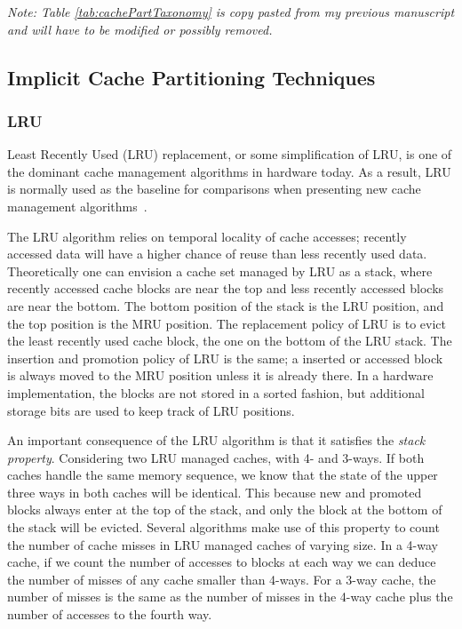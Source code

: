 \textit{Note: Table \ref{tab:cachePartTaxonomy} is copy pasted from my previous manuscript and will have to be modified or possibly removed.}



\subsection{Implicit Cache Partitioning Techniques}

\subsubsection{LRU}

Least Recently Used (LRU) replacement, or some simplification of LRU, is one of the dominant cache management algorithms in hardware today. 
As a result, LRU is normally used as the baseline for comparisons when presenting new cache management algorithms~\cite{Jaleel2010,Qureshi2006,Qureshi2007}.

The LRU algorithm relies on temporal locality of cache accesses; recently accessed data will have a higher chance of reuse than less recently used data.
Theoretically one can envision a cache set managed by LRU as a stack, where recently accessed cache blocks are near the top and less recently accessed blocks are near the bottom.
The bottom position of the stack is the LRU position, and the top position is the MRU position.
The replacement policy of LRU is to evict the least recently used cache block, the one on the bottom of the LRU stack.
The insertion and promotion policy of LRU is the same; a inserted or accessed block is always moved to the MRU position unless it is already there.
In a hardware implementation, the blocks are not stored in a sorted fashion, but additional storage bits are used to keep track of LRU positions.

An important consequence of the LRU algorithm is that it satisfies the \textit{stack property}.
Considering two LRU managed caches, with 4- and 3-ways.
If both caches handle the same memory sequence, we know that the state of the upper three ways in both caches will be identical.
This because new and promoted blocks always enter at the top of the stack, and only the block at the bottom of the stack will be evicted.
Several algorithms make use of this property to count the number of cache misses in LRU managed caches of varying size.
In a 4-way cache, if we count the number of accesses to blocks at each way we can deduce the number of misses of any cache smaller than 4-ways. 
For a 3-way cache, the number of misses is the same as the number of misses in the 4-way cache plus the number of accesses to the fourth way.

